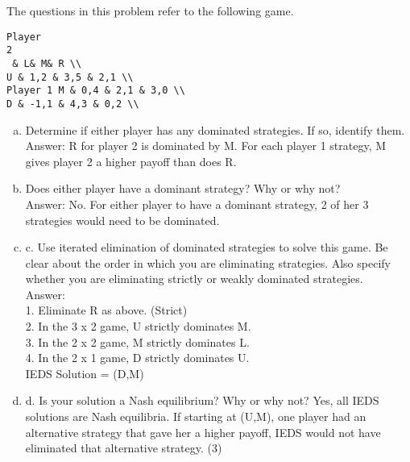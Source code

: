 \documentclass[a4paper,12pt]{article}
\begin{document}
The questions in this problem refer to the following game.
\begin{verbatim}
Player
2
 & L& M& R \\
U & 1,2 & 3,5 & 2,1 \\
Player 1 M & 0,4 & 2,1 & 3,0 \\
D & -1,1 & 4,3 & 0,2 \\
\end{verbatim}
\begin{enumerate}[(a)]
\item  Determine if either player has any dominated strategies. If so, identify them.\\
Answer: R for player 2 is dominated by M. For each player 1 strategy, M gives player 2 a higher
payoff than does R. 
\item Does either player have a dominant strategy? Why or why not?\\
Answer: No. For either player to have a dominant strategy, 2 of her 3 strategies would need to be
dominated. 
\item c. Use iterated elimination of dominated strategies to solve this game. Be clear about the order
in which you are eliminating strategies. Also specify whether you are eliminating strictly or
weakly dominated strategies.\\
Answer:\\
1. Eliminate R as above. (Strict) \\
2. In the 3 x 2 game, U strictly dominates M. \\
3. In the 2 x 2 game, M strictly dominates L. \\
4. In the 2 x 1 game, D strictly dominates U.\\
IEDS Solution = (D,M)\\
\item d. Is your solution a Nash equilibrium? Why or why not?
Yes, all IEDS solutions are Nash equilibria. If starting at (U,M), one player had an
alternative strategy that gave her a higher payoff, IEDS would not have eliminated that
alternative strategy. (3)
\end{enumerate}

\end{document}
